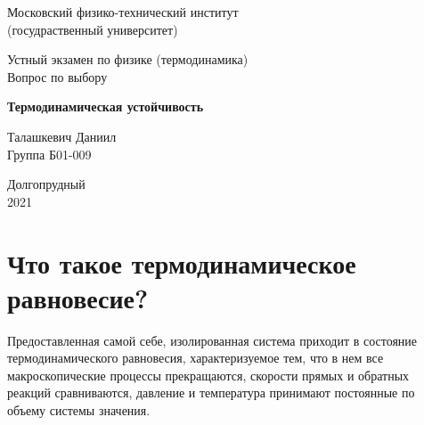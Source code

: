 \documentclass[a4paper,14pt]{article} %
\begin{document}


\begin{titlepage}

	\newpage
	\begin{center}
		\normalsize Московский физико-технический институт \\(госудраственный 			университет)
	\end{center}

	\vspace{6em}

	\begin{center}
		\Large Устный экзамен по физике (термодинамика)\\Вопрос по выбору
	\end{center}

	\vspace{1em}

	\begin{center}
		\large \textbf{Термодинамическая устойчивость}
	\end{center}

	\vspace{2em}

	\begin{center}
		\large Талашкевич Даниил\\
		Группа Б01-009
	\end{center}

	\vspace{\fill}

	\begin{center}
	Долгопрудный \\2021
	\end{center}
	
\end{titlepage}



\thispagestyle{empty}
\newpage
\tableofcontents
\newpage
\setcounter{page}{1}



\section{Что такое термодинамическое равновесие?}
Предоставленная самой себе,
изолированная система приходит в состояние термодинамического равновесия, характеризуемое тем, что в нем все макроскопические процессы
прекращаются, скорости прямых и обратных реакций сравниваются, давление и температура принимают постоянные по объему системы значения.
\end{document}
